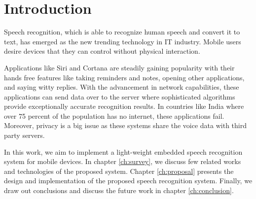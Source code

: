 \chapter{Introduction}
\hspace{3mm}

Speech recognition, which is able to recognize human speech and convert it to text, has emerged as the new trending technology in IT industry. Mobile users desire devices that they can control without physical interaction.

Applications like Siri and Cortana are steadily gaining popularity with their hands free features like taking reminders and notes, opening other applications, and saying witty replies. With the advancement in network capabilities, these applications can send data over to the server where sophisticated algorithms provide exceptionally accurate recognition results. In countries like India where over 75 percent of the population has no internet, these applications fail. Moreover, privacy is a big issue as these systems share the voice data with third party servers.

In this work, we aim to implement a light-weight embedded speech recognition system for mobile devices. In chapter \ref{ch:survey}, we discuss few related works and technologies of the proposed system. Chapter \ref{ch:proposal} presents the design and implementation of the proposed speech recognition system. Finally, we draw out conclusions and discuss the future work in chapter \ref{ch:conclusion}.